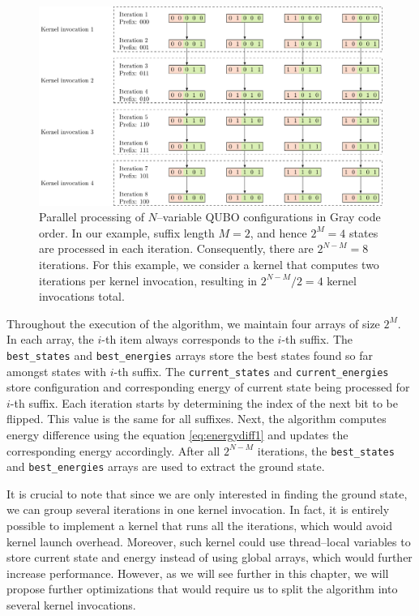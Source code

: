 \begin{figure}
  \includegraphics[width=\textwidth]{figures/grayparallel}
  \caption{
    Parallel processing of $N$--variable QUBO configurations in Gray code order. In
    our example, suffix length $M=2$, and hence $2^{M}=4$ states are processed in
    each iteration. Consequently, there are $2^{N-M}=8$ iterations. For this
    example, we consider a kernel that computes two iterations per kernel
    invocation, resulting in $2^{N-M}/2 = 4$ kernel invocations total. }
  \label{fig:grayparallel}
\end{figure}

Throughout the execution of the algorithm, we maintain four arrays of size
$2^{M}$. In each array, the $i$-th item always corresponds to the $i$-th
suffix. The \texttt{best\_states} and \texttt{best\_energies} arrays store the
best states found so far amongst states with $i$-th suffix. The
\texttt{current\_states} and \texttt{current\_energies} store configuration and
corresponding energy of current state being processed for $i$-th suffix. Each
iteration starts by determining the index of the next bit to be flipped. This
value is the same for all suffixes. Next, the algorithm computes energy
difference using the equation \ref{eq:energydiff1} and updates the
corresponding energy accordingly. After all $2^{N-M}$ iterations, the
\texttt{best\_states} and \texttt{best\_energies} arrays are used to extract
the ground state.

It is crucial to note that since we are only interested in finding the ground
state, we can group several iterations in one kernel invocation. In fact, it is
entirely possible to implement a kernel that runs all the iterations, which
would avoid kernel launch overhead. Moreover, such kernel could use
thread--local variables to store current state and energy instead of using
global arrays, which would further increase performance. However, as we will
see further in this chapter, we will propose further optimizations that would
require us to split the algorithm into several kernel invocations.

